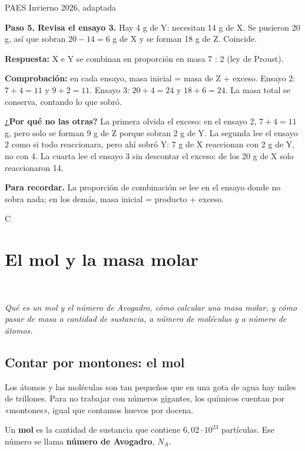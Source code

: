 \begin{elejemplo}{PAES Invierno 2026, adaptada}
{\textbf{Paso 5. Revisa el ensayo 3.} Hay 4 g de Y: necesitan 14 g de X. Se pusieron 20 g, así que sobran $20 - 14 = 6$ g de X y se forman 18 g de Z. Coincide. 

\textbf{Respuesta:} X e Y se combinan en proporción en masa 7 : 2 (ley de Proust).

\textbf{Comprobación:} en cada ensayo, masa inicial = masa de Z + exceso. Ensayo 2: $7 + 4 = 11$ y $9 + 2 = 11$. Ensayo 3: $20 + 4 = 24$ y $18 + 6 = 24$.  La masa total se conserva, contando lo que sobró.

\textbf{¿Por qué no las otras?} La primera olvida el exceso: en el ensayo 2, $7 + 4 = 11$ g, pero solo se forman 9 g de Z porque sobran 2 g de Y. La segunda lee el ensayo 2 como si todo reaccionara, pero ahí sobró Y: 7 g de X reaccionan con 2 g de Y, no con 4. La cuarta lee el ensayo 3 sin descontar el exceso: de los 20 g de X solo reaccionaron 14.

\textbf{\color{cienciaD}Para recordar.} La proporción de combinación se lee en el ensayo donde no sobra nada; en los demás, masa inicial = producto + exceso.}{C}
\end{elejemplo}

\section[El mol y la masa molar]{El mol y la masa molar}
\modcomun\ \ {\color{gris}\itshape Qué es un mol y el número de Avogadro, cómo calcular una masa molar, y cómo pasar de masa a cantidad de sustancia, a número de moléculas y a número de átomos.\par}
\subsection{Contar por montones: el mol}
Los átomos y las moléculas son tan pequeños que en una gota de agua hay miles de trillones. Para no trabajar con números gigantes, los químicos cuentan por «montones», igual que contamos huevos por docena.

 
\begin{clave}[{El mol}] Un \textbf{mol} es la cantidad de sustancia que contiene $6{,}02\cdot 10^{23}$ partículas. Ese número se llama \textbf{número de Avogadro}, $N_A$.\end{clave}
 


